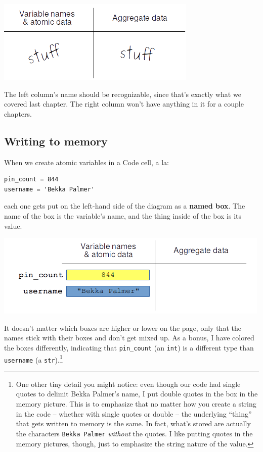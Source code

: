 \begin{center}
\includegraphics[width=.7\textwidth]{memoryPicture.png}
\end{center}

The left column's name should be recognizable, since that's exactly what we
covered last chapter. The right column won't have anything in it for a couple
chapters.

\subsection{Writing to memory}

When we create atomic variables in a Code cell, a la:

\begin{Verbatim}[fontsize=\small,samepage=true,frame=single,framesep=3mm]
pin_count = 844
username = 'Bekka Palmer'
\end{Verbatim}

each one gets put on the left-hand side of the diagram as a \textbf{named box}.
The name of the box is the variable's name, and the thing inside of the box is
its value.

\vspace{-.2in}
\begin{center}
\includegraphics[width=.8\textwidth]{memoryPicture2.png}
\end{center}

It doesn't matter which boxes are higher or lower on the page, only that the
names stick with their boxes and don't get mixed up. As a bonus, I have colored
the boxes differently, indicating that \texttt{pin\_count} (an \texttt{int}) is
a different type than \texttt{username} (a \texttt{str}).\footnote{One other
tiny detail you might notice: even though our code had single quotes to delimit
Bekka Palmer's name, I put double quotes in the box in the memory picture. This
is to emphasize that no matter how you create a string in the code -- whether
with single quotes or double -- the underlying ``thing'' that gets written to
memory is the same. In fact, what's stored are actually the characters
\texttt{Bekka Palmer} \textit{without} the quotes. I like putting quotes in the
memory pictures, though, just to emphasize the string nature of the value.}

